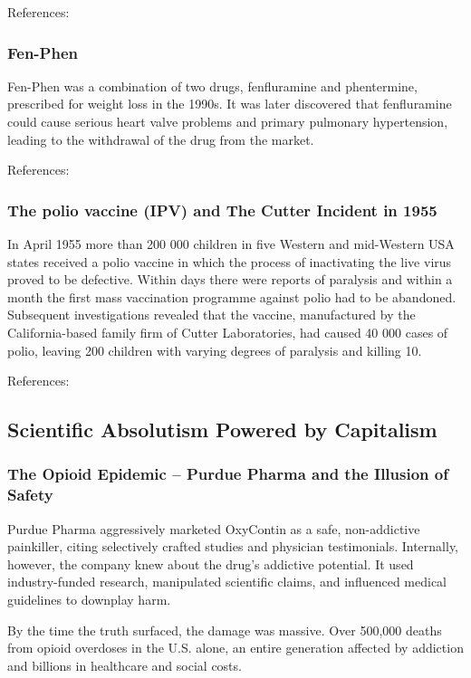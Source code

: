 \documentclass{article}
\begin{document}
References: \cite{Diethylstilbestrol2000}

\subsubsection{Fen-Phen}
Fen-Phen was a combination of two drugs, fenfluramine and phentermine, prescribed for weight loss in the 1990s. It was later discovered that fenfluramine could cause serious heart valve problems and primary
pulmonary hypertension, leading to the withdrawal of the drug from the market.

References: \cite{Wolff1997}

\subsubsection{The polio vaccine (IPV) and The Cutter Incident in 1955}

In April 1955 more than 200 000 children in five Western and mid-Western USA states received a polio vaccine in which the process of inactivating the live virus proved to be defective. Within days there were reports of paralysis and within a month the first mass vaccination programme against polio had to be abandoned. Subsequent investigations revealed that the vaccine, manufactured by the California-based family firm of Cutter Laboratories, had caused 40 000 cases of polio, leaving 200 children with varying degrees of paralysis and killing 10.

References: \cite{Fitzpatrick2006}

\subsection{Scientific Absolutism Powered by Capitalism}

\subsubsection{The Opioid Epidemic – Purdue Pharma and the Illusion of Safety}

Purdue Pharma aggressively marketed OxyContin as a safe, non-addictive painkiller, citing selectively crafted studies and physician testimonials. Internally, however, the company knew about the drug's addictive potential. It used industry-funded research, manipulated scientific claims, and influenced medical guidelines to downplay harm.

By the time the truth surfaced, the damage was massive. Over 500,000 deaths from opioid overdoses in the U.S. alone, an entire generation affected by addiction and billions in healthcare and social costs.
\end{document}

